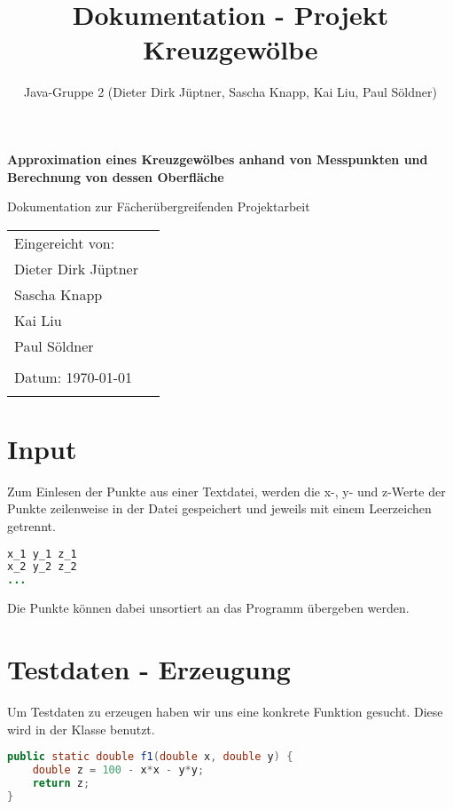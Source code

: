 \documentclass[11pt, bibliography=totocnumbered]{scrartcl}
\title{Dokumentation - Projekt Kreuzgew\"olbe}
\author{Java-Gruppe 2 (Dieter Dirk J\"uptner, Sascha Knapp, Kai Liu, Paul S\"oldner)}
\begin{document}
	\begin{titlepage}
		\begin{center}
			\vspace*{2cm}
			
			\huge
			\textbf{Approximation eines Kreuzgew\"olbes anhand von Messpunkten und Berechnung von dessen Oberfl\"ache}
			
			\vspace{1.5cm}
			\LARGE
			Dokumentation zur F\"acher\"ubergreifenden Projektarbeit
		\end{center}    
		\vspace{1cm}
		
		\vfill{}
		\large
		\begin{tabular}{@{}l l}
			Eingereicht von: & \\
			Dieter Dirk J\"uptner \\
			Sascha Knapp \\
			Kai Liu \\
			Paul S\"oldner \\
			\\
			Datum: \today \\
			\\
		\end{tabular}
		\vfill
	\end{titlepage}
\newpage
\tableofcontents
\newpage
\section{Input}
Zum Einlesen der Punkte aus einer Textdatei, werden die x-, y- und z-Werte der Punkte zeilenweise in der Datei gespeichert und jeweils mit einem Leerzeichen getrennt. 
\begin{lstlisting}[caption={Input-Datei}, label={lst:label}, language=Java]
x_1 y_1 z_1
x_2 y_2 z_2
...
\end{lstlisting}

Die Punkte k\"onnen dabei unsortiert an das Programm \"ubergeben werden. 

\section{Testdaten - Erzeugung}

Um Testdaten zu erzeugen haben wir uns eine konkrete Funktion gesucht. Diese wird in der Klasse \grqq benutzt.

\begin{lstlisting}[caption={Funktion zur Testdaten-Erzeugung}, label={lst:label}, language=Java]
public static double f1(double x, double y) {
	double z = 100 - x*x - y*y;
	return z;
}
\end{lstlisting}
\end{document}

